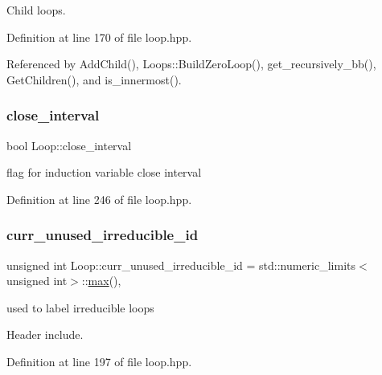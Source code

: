 Child loops. 



Definition at line 170 of file loop.\+hpp.



Referenced by Add\+Child(), Loops\+::\+Build\+Zero\+Loop(), get\+\_\+recursively\+\_\+bb(), Get\+Children(), and is\+\_\+innermost().

\mbox{\label{classLoop_aec746ac0a1f2671127e550763cf644ee}} 
\subsubsection{\texorpdfstring{close\+\_\+interval}{close\_interval}}
{\footnotesize\ttfamily bool Loop\+::close\+\_\+interval}



flag for induction variable close interval 



Definition at line 246 of file loop.\+hpp.

\mbox{\label{classLoop_a7da3779600d056f3ed5e0482e150d334}} 
\subsubsection{\texorpdfstring{curr\+\_\+unused\+\_\+irreducible\+\_\+id}{curr\_unused\_irreducible\_id}}
{\footnotesize\ttfamily unsigned int Loop\+::curr\+\_\+unused\+\_\+irreducible\+\_\+id = std\+::numeric\+\_\+limits$<$unsigned int$>$\+::\hyperlink{tutorial__pact__2019_2Target-Customization_2first_2hint_8c_a28f422940797ea297699ba55d89171c5}{max}()\hspace{0.3cm}{\ttfamily [static]}, {\ttfamily [private]}}



used to label irreducible loops 

Header include. 

Definition at line 197 of file loop.\+hpp.

\mbox{\label{classLoop_a3638f95a57821ebfcdb09eb4c140ed4c}} 

